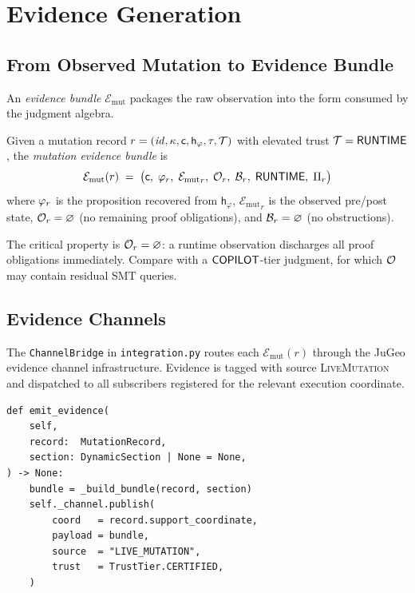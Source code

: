 \documentclass[11pt]{article}
\newcommand{\MutEvid}{{\mathcal{E}_{\mathrm{mut}}}}%
\newcommand{\Epoch}{\tau}                        %
\newcommand{\PropHash}{\mathsf{h}_\varphi}       %
\begin{document}
\section{Evidence Generation}
\label{sec:evidence}

\subsection{From Observed Mutation to Evidence Bundle}
\label{subsec:evid-gen}

An \emph{evidence bundle} $\MutEvid$ packages the raw observation into
the form consumed by the \JuGeo{} judgment algebra.

\begin{definition}
\label{def:evid-bundle}
Given a mutation record $r = (\mathit{id}, \kappa, \coord, \PropHash,
\Epoch, \trust)$ with elevated trust $\mathcal{T} = \mathsf{RUNTIME}$, the
\emph{mutation evidence bundle} is
\[
  \MutEvid(r) \;=\;
  \bigl(\coord,\;\prop_r,\;\MutEvid_r,\;
        \oblig_r,\;\obstr_r,\;\Truntime,\;\prov_r\bigr)
\]
where $\varphi_r$ is the proposition recovered from $\PropHash$,
$\MutEvid_r$ is the observed pre/post state, $\mathcal{O}_r =
\varnothing$ (no remaining proof obligations), and $\mathcal{B}_r
= \varnothing$ (no obstructions).
\end{definition}

The critical property is $\mathcal{O}_r = \varnothing$: a runtime
observation discharges all proof obligations immediately.  Compare
with a $\mathsf{COPILOT}$-tier judgment, for which $\mathcal{O}$ may contain
residual SMT queries.

\subsection{Evidence Channels}
\label{subsec:channels}

The \texttt{ChannelBridge} in \texttt{integration.py} routes each
$\MutEvid(r)$ through the JuGeo evidence channel infrastructure.
Evidence is tagged with source \textsc{LiveMutation} and dispatched to
all subscribers registered for the relevant execution coordinate.

\begin{lstlisting}[style=jugeo-python,
    caption={ChannelBridge.emit\_evidence (integration.py, abridged)}]
def emit_evidence(
    self,
    record:  MutationRecord,
    section: DynamicSection | None = None,
) -> None:
    bundle = _build_bundle(record, section)
    self._channel.publish(
        coord   = record.support_coordinate,
        payload = bundle,
        source  = "LIVE_MUTATION",
        trust   = TrustTier.CERTIFIED,
    )
\end{lstlisting}
\end{document}
